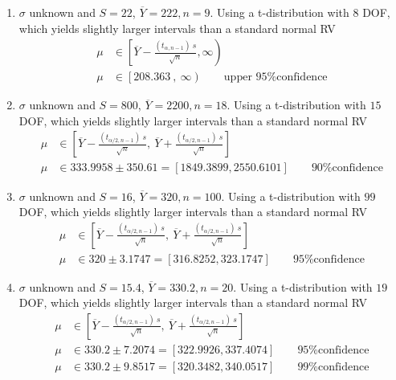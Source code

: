 \begin{enumerate}
	\item $ \sigma $ unknown and $ S = 22 $, $ \overline{Y} = 222, n = 9$. Using a t-distribution with $ 8 $ DOF, which yields slightly larger intervals than a standard normal RV\\
	\begin{subequations}
		\begin{align}
			\mu &\in \left[ \overline{Y} - \frac{(t_{\alpha, n-1})\ s}{\sqrt{n}}, \infty \right) \nonumber \\
			\mu &\in \left[208.363\ ,\ \infty\right) \qquad \text{upper 95\% confidence}
		\end{align}
	\end{subequations}

	\item $ \sigma $ unknown and $ S = 800 $, $ \overline{Y} = 2200, n = 18$. Using a t-distribution with $ 15 $ DOF, which yields slightly larger intervals than a standard normal RV\\
	\begin{subequations}
		\begin{align}
			\mu &\in \left[ \overline{Y} - \frac{(t_{\alpha/2, n-1})\ s}{\sqrt{n}}, \ \overline{Y} + \frac{(t_{\alpha/2, n-1})\ s}{\sqrt{n}} \right] \nonumber \\
			\mu &\in 333.9958 \pm 350.61 = [1849.3899, 2550.6101] \qquad \text{90\% confidence}
		\end{align}
	\end{subequations}

	\item $ \sigma $ unknown and $ S = 16 $, $ \overline{Y} = 320, n = 100$. Using a t-distribution with $ 99 $ DOF, which yields slightly larger intervals than a standard normal RV\\
	\begin{subequations}
		\begin{align}
			\mu &\in \left[ \overline{Y} - \frac{(t_{\alpha/2, n-1})\ s}{\sqrt{n}}, \ \overline{Y} + \frac{(t_{\alpha/2, n-1})\ s}{\sqrt{n}} \right] \nonumber \\
			\mu &\in 320 \pm 3.1747 = [316.8252, 323.1747] \qquad \text{95\% confidence}
		\end{align}
	\end{subequations}
	
	\item $ \sigma $ unknown and $ S = 15.4 $, $ \overline{Y} = 330.2, n = 20$. Using a t-distribution with $ 19 $ DOF, which yields slightly larger intervals than a standard normal RV\\
	\begin{subequations}
		\begin{align}
			\mu &\in \left[ \overline{Y} - \frac{(t_{\alpha/2, n-1})\ s}{\sqrt{n}}, \ \overline{Y} + \frac{(t_{\alpha/2, n-1})\ s}{\sqrt{n}} \right] \nonumber \\
			\mu &\in 330.2 \pm 7.2074 = [322.9926, 337.4074] \qquad \text{95\% confidence} \nonumber \\
			\mu &\in 330.2 \pm 9.8517 = [320.3482, 340.0517] \qquad \text{99\% confidence}
		\end{align}
	\end{subequations}


\end{enumerate}
